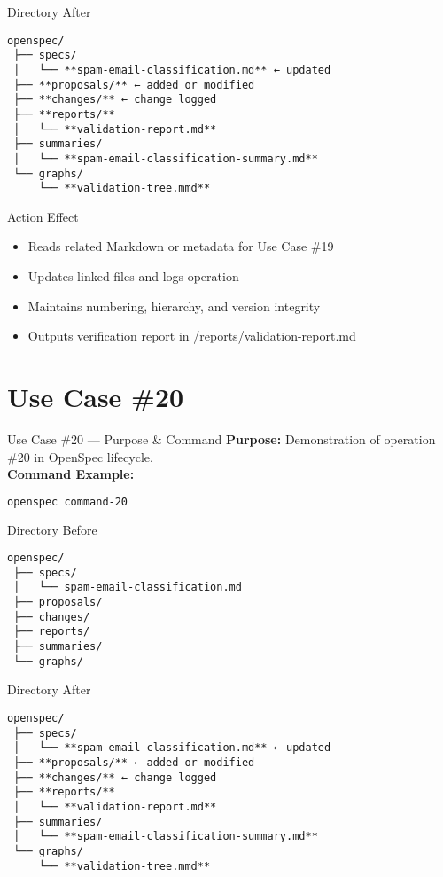 \documentclass[aspectratio=169]{beamer}
\begin{document}
\begin{frame}{Directory After}
\begin{lstlisting}
openspec/
 ├── specs/
 │   └── **spam-email-classification.md** ← updated
 ├── **proposals/** ← added or modified
 ├── **changes/** ← change logged
 ├── **reports/**
 │   └── **validation-report.md**
 ├── summaries/
 │   └── **spam-email-classification-summary.md**
 └── graphs/
     └── **validation-tree.mmd**
\end{lstlisting}
\end{frame}

\begin{frame}{Action Effect}
\begin{itemize}
  \item Reads related Markdown or metadata for Use Case \#19
  \item Updates linked files and logs operation
  \item Maintains numbering, hierarchy, and version integrity
  \item Outputs verification report in /reports/validation-report.md
\end{itemize}
\end{frame}

\section*{Use Case \#20}
\begin{frame}{Use Case \#20 --- Purpose \& Command}
\textbf{Purpose:} Demonstration of operation \#20 in OpenSpec lifecycle.\\[4pt]
\textbf{Command Example:}
\begin{lstlisting}[language=bash]
openspec command-20
\end{lstlisting}
\end{frame}

\begin{frame}{Directory Before}
\begin{lstlisting}
openspec/
 ├── specs/
 │   └── spam-email-classification.md
 ├── proposals/
 ├── changes/
 ├── reports/
 ├── summaries/
 └── graphs/
\end{lstlisting}
\end{frame}

\begin{frame}{Directory After}
\begin{lstlisting}
openspec/
 ├── specs/
 │   └── **spam-email-classification.md** ← updated
 ├── **proposals/** ← added or modified
 ├── **changes/** ← change logged
 ├── **reports/**
 │   └── **validation-report.md**
 ├── summaries/
 │   └── **spam-email-classification-summary.md**
 └── graphs/
     └── **validation-tree.mmd**
\end{lstlisting}
\end{frame}
\end{document}

